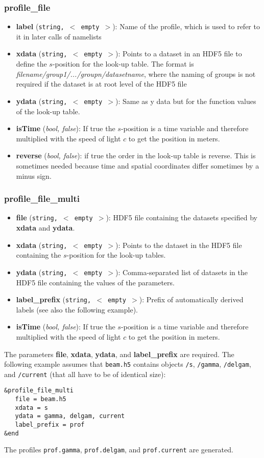 \documentclass[12pt]{book}
\begin{document}
\subsubsection{\sf profile\_file}
\begin{itemize}
\item{\bf label} ({\tt string, $<$ empty $>$}): Name of the profile, which is used to refer to it in later calls of namelists
\item{\bf xdata} ({\tt string, $<$ empty $>$}): Points to a dataset in an HDF5 file to define the $s$-position for the look-up table. The format is {\it filename/group1/.../groupn/datasetname}, where the naming of groups is not required if the dataset is at root level of the HDF5 file 
\item{\bf ydata} ({\tt string, $<$ empty $>$}): Same as y data but for the function values of the look-up table.
\item{\bf isTime} ({\it bool, false}): If true the $s$-position is a time variable and therefore multiplied with the speed of light $c$ to get the position in meters.
\item{\bf reverse} ({\it bool, false}): if true the order in the look-up table is reverse. This is sometimes needed because time and spatial coordinates differ sometimes by a minus sign.
\end{itemize}
\subsubsection{\sf profile\_file\_multi}
\begin{itemize}
\item{\bf file} ({\tt string, $<$ empty $>$}): HDF5 file containing the datasets specified by {\bf xdata} and {\bf ydata}.
\item{\bf xdata} ({\tt string, $<$ empty $>$}): Points to the dataset in the HDF5 file containing the $s$-position for the look-up tables.
\item{\bf ydata} ({\tt string, $<$ empty $>$}): Comma-separated list of datasets in the HDF5 file containing the values of the parameters.
\item{\bf label\_prefix} ({\tt string, $<$ empty $>$}): Prefix of automatically derived labels (see also the following example).
\item{\bf isTime} ({\it bool, false}): If true the $s$-position is a time variable and therefore multiplied with the speed of light $c$ to get the position in meters.
\end{itemize}
The parameters {\bf file}, {\bf xdata}, {\bf ydata}, and {\bf label\_prefix} are required. The following example assumes that {\tt beam.h5} contains objects {\tt /s}, {\tt /gamma}, {\tt /delgam}, and {\tt /current} (that all have to be of identical size):
\begin{verbatim}
&profile_file_multi
   file = beam.h5
   xdata = s
   ydata = gamma, delgam, current
   label_prefix = prof
&end
\end{verbatim}
The profiles {\tt prof.gamma}, {\tt prof.delgam}, and {\tt prof.current} are generated.
\end{document}
